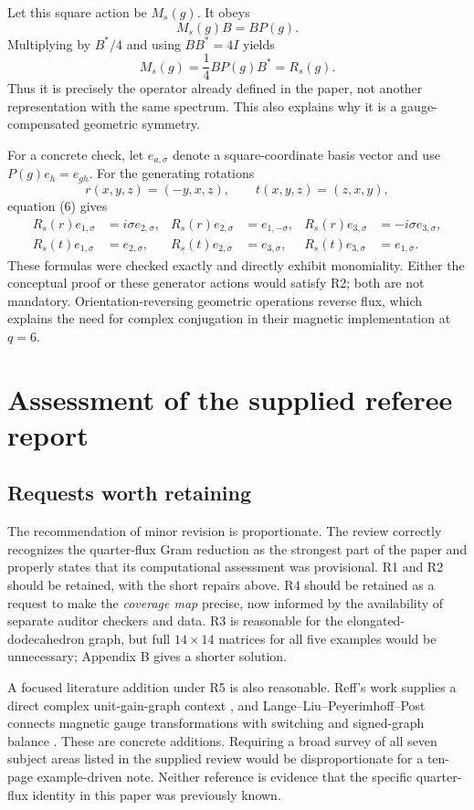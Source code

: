 \documentclass[11pt,a4paper]{article}
\begin{document}
Let this square action be $M_s(g)$. It obeys
\[
 M_s(g)B=BP(g).
\]
Multiplying by $B^*/4$ and using $BB^*=4I$ yields
\[
 M_s(g)=\frac14BP(g)B^*=R_s(g).
\]
Thus it is precisely the operator already defined in the paper, not another representation with the same spectrum. This also explains why it is a gauge-compensated geometric symmetry.

For a concrete check, let $e_{a,\sigma}$ denote a square-coordinate basis vector and use $P(g)e_h=e_{gh}$. For the generating rotations
\[
 r(x,y,z)=(-y,x,z),\qquad t(x,y,z)=(z,x,y),
\]
equation (6) gives
\begin{align}
 R_s(r)e_{1,\sigma}&=i\sigma e_{2,\sigma},&
 R_s(r)e_{2,\sigma}&=e_{1,-\sigma},&
 R_s(r)e_{3,\sigma}&=-i\sigma e_{3,\sigma},\\
 R_s(t)e_{1,\sigma}&=e_{2,\sigma},&
 R_s(t)e_{2,\sigma}&=e_{3,\sigma},&
 R_s(t)e_{3,\sigma}&=e_{1,\sigma}.
\end{align}
These formulas were checked exactly and directly exhibit monomiality. Either the conceptual proof or these generator actions would satisfy R2; both are not mandatory. Orientation-reversing geometric operations reverse flux, which explains the need for complex conjugation in their magnetic implementation at $q=6$.

\section{Assessment of the supplied referee report}
\subsection{Requests worth retaining}
The recommendation of minor revision is proportionate. The review correctly recognizes the quarter-flux Gram reduction as the strongest part of the paper and properly states that its computational assessment was provisional. R1 and R2 should be retained, with the short repairs above. R4 should be retained as a request to make the \emph{coverage map} precise, now informed by the availability of separate auditor checkers and data. R3 is reasonable for the elongated-dodecahedron graph, but full $14\times14$ matrices for all five examples would be unnecessary; Appendix B gives a shorter solution.

A focused literature addition under R5 is also reasonable. Reff's work supplies a direct complex unit-gain-graph context \cite{reff}, and Lange--Liu--Peyerimhoff--Post connects magnetic gauge transformations with switching and signed-graph balance \cite{lange}. These are concrete additions. Requiring a broad survey of all seven subject areas listed in the supplied review would be disproportionate for a ten-page example-driven note. Neither reference is evidence that the specific quarter-flux identity in this paper was previously known.
\end{document}
